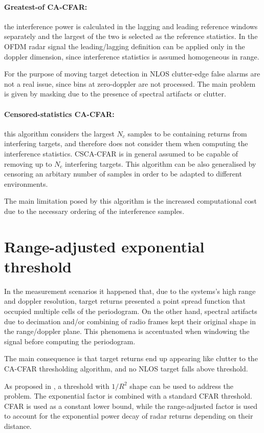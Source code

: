 \paragraph{Greatest-of CA-CFAR:}
the interference power is calculated in the lagging and leading reference windows separately and the largest of the two is selected as the reference statistics. In the OFDM radar signal the leading/lagging definition can be applied only in the doppler dimension, since interference statistics is assumed homogeneous in range.

For the purpose of moving target detection in NLOS clutter-edge false alarms are not a real issue, since bins at zero-doppler are not processed.
 The main problem is given by masking due to the presence of spectral artifacts or clutter.
 
 
\paragraph{Censored-statistics CA-CFAR:}
this algorithm considers the largest $N_c$ samples to be containing returns from interfering targets, and therefore does not consider them when computing the interference statistics. CSCA-CFAR is in general assumed to be capable of removing up to $N_c$ interfering targets.
This algorithm can be also generalised by censoring an arbitary number of samples in order to be adapted to different environments. 

The main limitation posed by this algorithm is the increased computational cost due to the necessary ordering of the interference samples.


\section{Range-adjusted exponential threshold}

In the measurement scenarios it happened that, due to the systems's high range and doppler resolution, target returns presented a point spread function that occupied multiple cells of the periodogram. On the other hand, spectral artifacts due to decimation and/or combining of radio frames kept their original shape in the range/doppler plane. This phenomena is accentuated when windowing the signal before computing the periodogram.

The main consequence is that target returns end up appearing like clutter to the CA-CFAR thresholding algorithm, and no NLOS target falls above threshold.

As proposed in \cite{Wagner_Feger_Stelzer_2017}, a threshold with $1/R^2$ shape can be used to address the problem. 
The exponential factor is combined with a standard CFAR threshold. CFAR is used as a constant lower bound, while the range-adjusted factor is used to account for the exponential power decay of radar returns depending on their distance.

